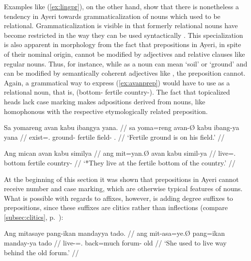 Examples like (\ref{ex:lingpr}), on the other hand, show that there is
nonetheless a tendency in Ayeri towards grammaticalization of nouns which used
to be relational. Grammaticalization is visible in that formerly relational
nouns have become restricted in the way they can be used syntactically
\citep[174]{lehmann2015}. This specialization is also apparent in morphology
from the fact that prepositions in Ayeri, in spite of their nominal origin,
cannot be modified by adjectives and relative clauses like regular nouns. Thus,
for instance, while  as a noun can mean `soil' or `ground' and
can be modified by semantically coherent adjectives like
, the preposition  cannot. Again, a
grammatical way to express (\ref{ex:avanprep}) would have to use
 as a relational noun, that is, 
(bottom-\Loc{} fertile country-\Gen{}). The fact that topicalized heads lack
case marking makes adpositions derived from nouns, like 
homophonous with the respective etymologically related preposition.

\pex
\a\label{ex:avannn}\begingl
	\gla Sa yomareng avan kabu ibangya yana. //
	\glb sa yoma=reng avan-Ø kabu ibang-ya yana //
	\glc \PatT{} exist=\TsgI.\AargI{} ground-\Top{} fertile field-\Loc{} 
		\TsgM{}.\Gen{} //
	\glft `Fertile ground is on his field.' //
\endgl

\a\label{ex:avanprep}\ljudge* \begingl
	\gla Ang mican avan kabu similya //
	\glb ang mit=yan.Ø avan kabu simil-ya //
	\glc \AgtT{} live=\TplM{}.\Top{} bottom fertile country-\Loc{} //
	\glft `*They live at the fertile bottom of the country.' //
\endgl

\xe

At the beginning of this section it was shown that prepositions in Ayeri cannot
receive number and case marking, which are otherwise typical features of nouns.
What is possible with regards to affixes, however, is adding degree suffixes to
prepositions, since these suffixes are clitics rather than inflections 
(compare \autoref{subsec:clitics}, p.~\pageref{clitics_quant}):

\ex\label{ex:prepquant}\begingl
	\gla Ang mitasaye pang-ikan mandayya tado. //
	\glb ang mit-asa=ye.Ø pang=ikan manday-ya tado //
	\glc \AgtT{} live-\Hab{}=\TsgF{}.\Top{} back=much forum-\Loc{} old //
	\glft `She used to live way behind the old forum.' //
\endgl\xe

